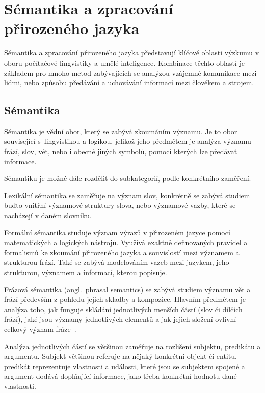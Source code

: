 \clearpage
\section{Sémantika a zpracování přirozeného jazyka}
Sémantika a zpracování přirozeného jazyka představují klíčové oblasti výzkumu v oboru počítačové lingvistiky a umělé inteligence.
Kombinace těchto oblastí je základem pro mnoho metod zabývajících se analýzou vzájemné komunikace mezi lidmi,
nebo způsobu předávání a uchovávání informací mezi člověkem a strojem.

\subsection{Sémantika}
Sémantika je vědní obor, který se zabývá zkoumáním významu.
Je to obor související s~lingvistikou a logikou, jelikož jeho předmětem je analýza významu frází, slov, vět, nebo i obecně jiných symbolů,
pomocí kterých lze předávat informace.~\cite{palmer1981semantics}

Sémantiku je možné dále rozdělit do subkategorií, podle konkrétního zaměření.

Lexikální sémantika se zaměřuje na význam slov, konkrétně se zabývá studiem buďto vnitřní významové struktury slova,
nebo významové vazby, které se nacházejí v daném slovníku.~\cite{lexical-semantics}

Formální sémantika studuje význam výrazů v přirozeném jazyce pomocí matematických a logických nástrojů.
Využívá exaktně definovaných pravidel a formalismů ke zkoumání přirozeného jazyka a souvislostí mezi významem a strukturou frází.
Také se zabývá modelováním vazeb mezi jazykem, jeho strukturou, významem a informací, kterou popisuje.~\cite{rajman2007speech, portner2008formal}

Frázová sémantika (angl.~phrasal semantics) se zabývá studiem významu vět a frází především z pohledu jejich skladby a kompozice.
Hlavním předmětem je analýza toho, jak funguje skládání jednotlivých menších částí (slov či dílčích frází),
jaké jsou významy jednotlivých elementů a jak jejich složení ovlivní celkový význam fráze~\cite{riemer2010introducing-semantic}.

Analýza jednotlivých částí se většinou zaměřuje na rozlišení subjektu, predikátu a argumentu.
Subjekt většinou referuje na nějaký konkrétní objekt či entitu, predikát reprezentuje vlastnosti a události, které jsou se subjektem spojené
a argument dodává doplňující informace, jako třeba konkrétní hodnotu dané vlastnosti.~\cite{fasold2006introduction}


